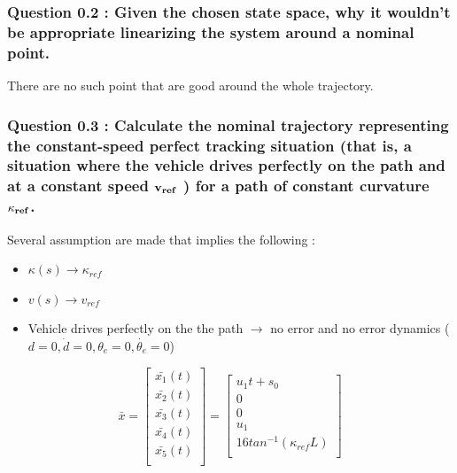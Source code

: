 \subsubsection*{Question 0.2 : Given the chosen state space, why it wouldn’t be appropriate linearizing the system around a nominal point.}
There are no such point that are good around the whole trajectory.



\subsubsection*{Question 0.3 : Calculate the nominal trajectory representing the constant-speed perfect tracking situation (that is, a situation where the vehicle drives perfectly on the path and at a constant speed $\bold{v_{ref}}$ ) for a path of constant curvature $\bold{\kappa_{ref}}$.}
Several assumption are made that implies the following :
\begin{itemize}
    \item $\kappa(s) \longrightarrow \kappa_{ref}$
    \item $v(s) \longrightarrow v_{ref}$
    \item Vehicle drives perfectly on the the path $\longrightarrow$ no error and no error dynamics ($d=0, \dot{d}=0, \theta_e=0, \dot{\theta_e}=0$)
\end{itemize}

\begin{equation}
    \bar{x}
    =
    \left[ {\begin{array}{c}
        \bar{x_1}(t)\\
        \bar{x_2}(t)\\
        \bar{x_3}(t)\\
        \bar{x_4}(t)\\
        \bar{x_5}(t)\\
    \end{array} } \right]
    =
    \left[ {\begin{array}{c}
        u_1 t + s_0\\
        0\\
        0\\
        u_1\\
        16 tan^{-1}(\kappa_{ref} L)\\
    \end{array} } \right]
\end{equation}



